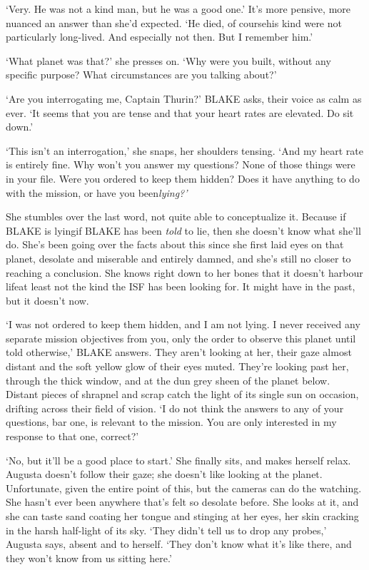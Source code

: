 `Very. He was not a kind man, but he was a good one.' It's more
pensive, more nuanced an answer than she'd expected. `He died, of
course\textemdash his kind were not particularly long-lived. And
especially not then. But I remember him.'

`What planet was that?' she presses on. `Why were you built, without
any specific purpose? What circumstances are you talking about?'

`Are you interrogating me, Captain Thurin?' BLAKE asks, their voice as
calm as ever. `It seems that you are tense and that your heart rates
are elevated. Do sit down.'

`This isn't an interrogation,' she snaps, her shoulders tensing. `And
my heart rate is entirely fine. Why won't you answer my questions?
None of those things were in your file. Were you ordered to keep them
hidden? Does it have anything to do with the mission, or have you
been\textellipsis \emph{lying?'}

She stumbles over the last word, not quite able to conceptualize
it. Because if BLAKE is lying\textemdash if BLAKE has
been \emph{told} to lie, then she doesn't know what she'll do. She's
been going over the facts about this since she first laid eyes on that
planet, desolate and miserable and entirely damned, and she's still no
closer to reaching a conclusion. She knows right down to her bones
that it doesn't harbour life\textemdash at least not the kind the
ISF has been looking for. It might have in the past, but it doesn't
now.

`I was not ordered to keep them hidden, and I am not lying. I never
received any separate mission objectives from you, only the order to
observe this planet until told otherwise,' BLAKE answers. They aren't
looking at her, their gaze almost distant and the soft yellow glow of
their eyes muted. They're looking past her, through the thick window,
and at the dun grey sheen of the planet below. Distant pieces of
shrapnel and scrap catch the light of its single sun on occasion,
drifting across their field of vision. `I do not think the answers to
any of your questions, bar one, is relevant to the mission. You are
only interested in my response to that one, correct?'

`No, but it'll be a good place to start.' She finally sits, and makes
herself relax. Augusta doesn't follow their gaze; she doesn't like
looking at the planet. Unfortunate, given the entire point of this,
but the cameras can do the watching. She hasn't ever been anywhere
that's felt so desolate before. She looks at it, and she can taste
sand coating her tongue and stinging at her eyes, her skin cracking in
the harsh half-light of its sky. `They didn't tell us to drop any
probes,' Augusta says, absent and to herself. `They don't know what
it's like there, and they won't know from us sitting here.'

